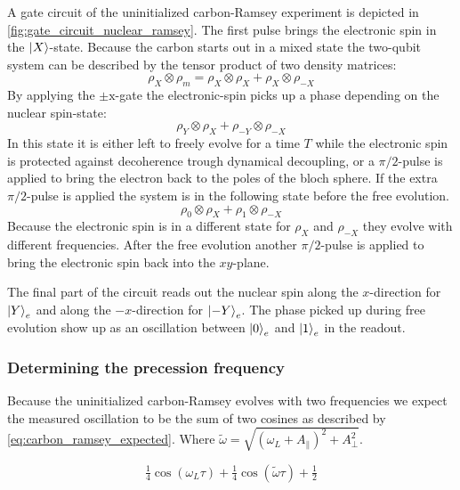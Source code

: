 A gate circuit of the uninitialized carbon-Ramsey experiment is depicted in \cref{fig:gate_circuit_nuclear_ramsey}.
The first pulse brings the electronic spin in the ${\left\vert{X}\right\rangle}$-state.
Because the carbon starts out in a mixed state the two-qubit system can be described by the tensor product of two density matrices:
\begin{equation}
    \rho_X \otimes \rho_m = \rho_X \otimes \rho_{X} +\rho_X \otimes \rho_{-X}
\end{equation}
By applying the $\pm{\mathrm{x}}$-gate  the electronic-spin picks up a phase depending on the nuclear spin-state:
\begin{equation}
     \rho_Y \otimes \rho_{X} +\rho_{-Y} \otimes \rho_{-X}
    \label{eq:density_after_Ren}
\end{equation}
In this state it is either left to freely evolve for a time $T$ while the electronic spin is protected against decoherence trough dynamical decoupling, or a $\pi/2$-pulse is applied to bring the electron back to the poles of the bloch sphere.
If the extra $\pi/2$-pulse is applied the system is in the following state before the free evolution.
\begin{equation}
     \rho_0 \otimes \rho_{X} +\rho_{1} \otimes \rho_{-X}
    \label{eq:density_after_Ren}
\end{equation}
Because the electronic spin is in a different state for $\rho_{X}$ and $\rho_{-X}$ they evolve with different frequencies.
After the free evolution another $\pi/2$-pulse is applied to bring the electronic spin back into the $xy$-plane.

The final part of the circuit reads out the nuclear spin along the $x$-direction for ${\left\vert{Y}\right\rangle}_e$ and along the $-x$-direction for ${\left\vert{-Y}\right\rangle}_e$.
The phase picked up during free evolution show up as an oscillation between ${\left\vert{0}\right\rangle}_e$ and ${\left\vert{1}\right\rangle}_e$ in the readout.

\subsubsection{Determining the precession frequency}
Because the uninitialized carbon-Ramsey evolves with two frequencies we expect the measured oscillation to be the sum of two cosines as described by \cref{eq:carbon_ramsey_expected}. Where $ \tilde\omega =   \sqrt{(\omega_L+A_\parallel) ^2 + A_\perp^2} $.

\begin{equation}
    \tfrac{1}{4} \cos(\omega_L \tau ) +\tfrac{1}{4}  \cos (\tilde{\omega} \tau ) + \tfrac{1}{2}
    \label{eq:carbon_ramsey_expected}
\end{equation}

